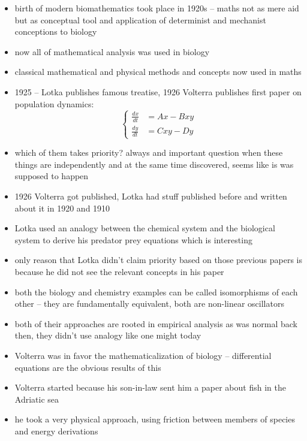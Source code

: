\documentclass[a4paper,reqno,11pt]{article}
\begin{document}
\begin{itemize}
    \item birth of modern biomathematics took place in 1920s -- maths not as
        mere aid but as conceptual tool and application of determinist and
        mechanist conceptions to biology
    \item now all of mathematical analysis was used in biology
    \item classical mathematical and physical methods and concepts now used in
        maths
    \item 1925 -- Lotka publishes famous treatise, 1926 Volterra publishes
        first paper on population dynamics:
        \begin{equation}\nonumber
            \left\{\begin{aligned}
                \frac{dx}{dt} &= Ax - Bxy \\
                \frac{dy}{dt} &= Cxy - Dy
            \end{aligned}\right.
        \end{equation}
    \item which of them takes priority? always and important question when
        these things are independently and at the same time discovered, seems
        like is was supposed to happen
    \item 1926 Volterra got published, Lotka had stuff published before and
        written about it in 1920 and 1910
    \item Lotka used an analogy between the chemical system and the biological
        system to derive his predator prey equations which is interesting
    \item only reason that Lotka didn't claim priority based on those previous
        papers is because he did not see the relevant concepts in his paper
    \item both the biology and chemistry examples can be called isomorphisms of
        each other -- they are fundamentally equivalent, both are non-linear
        oscillators
    \item both of their approaches are rooted in empirical analysis as was
        normal back then, they didn't use analogy like one might today
    \item Volterra was in favor the mathematicalization of biology --
        differential equations are the obvious results of this
    \item Volterra started because his son-in-law sent him a paper about fish
        in the Adriatic sea
    \item he took a very physical approach, using friction between members of
        species and energy derivations
\end{itemize}
\end{document}
